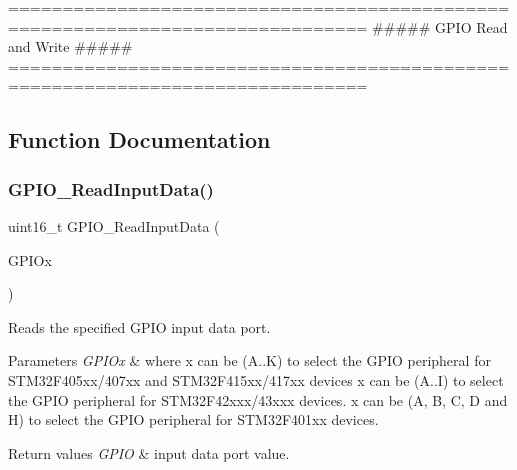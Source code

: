 \begin{DoxyVerb} ===============================================================================
                         ##### GPIO Read and Write #####
 ===============================================================================  \end{DoxyVerb}
 

\subsection{Function Documentation}
\mbox{\label{group___g_p_i_o___group2_ga139a33adc8409288e9f193bbebb5a0f7}} 
\subsubsection{\texorpdfstring{G\+P\+I\+O\+\_\+\+Read\+Input\+Data()}{GPIO\_ReadInputData()}}
{\footnotesize\ttfamily uint16\+\_\+t G\+P\+I\+O\+\_\+\+Read\+Input\+Data (\begin{DoxyParamCaption}\item[{G\+P\+I\+O\+\_\+\+Type\+Def $\ast$}]{G\+P\+I\+Ox }\end{DoxyParamCaption})}



Reads the specified G\+P\+IO input data port. 


\begin{DoxyParams}{Parameters}
{\em G\+P\+I\+Ox} & where x can be (A..K) to select the G\+P\+IO peripheral for S\+T\+M32\+F405xx/407xx and S\+T\+M32\+F415xx/417xx devices x can be (A..I) to select the G\+P\+IO peripheral for S\+T\+M32\+F42xxx/43xxx devices. x can be (A, B, C, D and H) to select the G\+P\+IO peripheral for S\+T\+M32\+F401xx devices. \\
\hline
\end{DoxyParams}

\begin{DoxyRetVals}{Return values}
{\em G\+P\+IO} & input data port value. \\
\hline
\end{DoxyRetVals}
\mbox{\label{group___g_p_i_o___group2_ga98772ef6b639b3fa06c8ae5ba28d3aaa}} 
